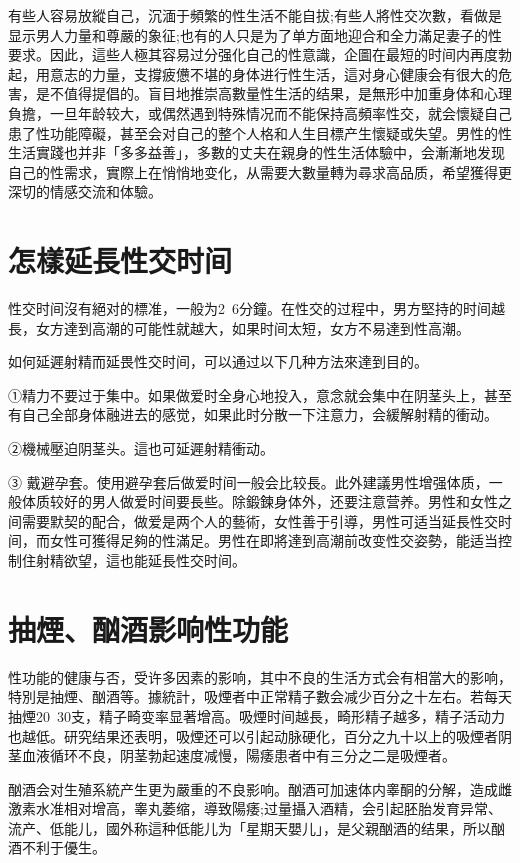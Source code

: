 \documentclass[12pt,UTF8]{ctexbook}
\begin{document}
有些人容易放縱自己，沉湎于頻繁的性生活不能自拔;有些人將性交次數，看做是显示男人力量和尊嚴的象征;也有的人只是为了单方面地迎合和全力滿足妻子的性要求。因此，這些人極其容易过分强化自己的性意識，企圖在最短的时间内再度勃起，用意志的力量，支撐疲憊不堪的身体进行性生活，這对身心健康会有很大的危害，是不值得提倡的。盲目地推崇高數量性生活的结果，是無形中加重身体和心理負擔，一旦年龄较大，或偶然遇到特殊情况而不能保持高頻率性交，就会懷疑自己患了性功能障礙，甚至会对自己的整个人格和人生目標产生懷疑或失望。男性的性生活實踐也并非「多多益善」，多數的丈夫在親身的性生活体驗中，会漸漸地发现自己的性需求，實際上在悄悄地变化，从需要大數量轉为尋求高品质，希望獲得更深切的情感交流和体驗。

\section{怎樣延長性交时间}

性交时间沒有絕对的標准，一般为2~6分鐘。在性交的过程中，男方堅持的时间越長，女方達到高潮的可能性就越大，如果时间太短，女方不易達到性高潮。

如何延遲射精而延畏性交时间，可以通过以下几种方法來達到目的。

①精力不要过于集中。如果做爱时全身心地投入，意念就会集中在阴茎头上，甚至有自己全部身体融进去的感觉，如果此时分散一下注意力，会緩解射精的衝动。

②機械壓迫阴茎头。這也可延遲射精衝动。

③ 戴避孕套。使用避孕套后做爱时间一般会比较長。此外建議男性增强体质，一般体质较好的男人做爱时间要長些。除鍛鍊身体外，还要注意营养。男性和女性之间需要默契的配合，做爱是两个人的藝術，女性善于引導，男性可适当延長性交时间，而女性可獲得足夠的性滿足。男性在即將達到高潮前改变性交姿勢，能适当控制住射精欲望，這也能延長性交时间。

\section{抽煙、酗酒影响性功能}

性功能的健康与否，受许多因素的影响，其中不良的生活方式会有相當大的影响，特別是抽煙、酗酒等。據統計，吸煙者中正常精子數会减少百分之十左右。若每天抽煙20~30支，精子畸变率显著增高。吸煙时间越長，畸形精子越多，精子活动力也越低。研究结果还表明，吸煙还可以引起动脉硬化，百分之九十以上的吸煙者阴茎血液循环不良，阴茎勃起速度减慢，陽痿患者中有三分之二是吸煙者。

酗酒会对生殖系統产生更为嚴重的不良影响。酗酒可加速体内睾酮的分解，造成雌激素水准相对增高，睾丸萎缩，導致陽痿;过量攝入酒精，会引起胚胎发育异常、流产、低能儿，國外称這种低能儿为「星期天嬰儿」，是父親酗酒的结果，所以酗酒不利于優生。
\end{document}
